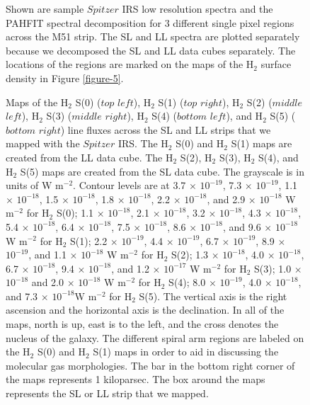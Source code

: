 \documentclass[12pt,preprint]{aastex}
\begin{document}
\clearpage

\begin{figure}
\caption{Shown are sample $Spitzer$ IRS low resolution 
spectra and the PAHFIT spectral decomposition for 3 different 
single pixel regions across the M51 strip.  The SL and LL spectra 
are plotted separately because we decomposed the SL and LL 
data cubes separately.  The locations of the regions are 
marked on the maps of the H$_2$ surface density in Figure 
\ref{figure-5}.}
\label{figure-2}
\end{figure}

\clearpage

\begin{figure}
 \end{figure}
 \clearpage
 
 \begin{figure}
 \caption{Maps of the H$_2$ S(0) ($top$ $left$), H$_2$ S(1)
 ($top$ $right$), H$_2$ S(2) ($middle$ $left$), H$_2$ S(3) 
 ($middle$ $right$), H$_2$ S(4) ($bottom$ $left$), and H$_2$ 
 S(5) ($bottom$ $right$) line fluxes across the SL and LL strips that we mapped 
 with the $Spitzer$ IRS.  The H$_2$ S(0) and H$_2$ S(1) 
 maps are created from the LL data cube.    
The H$_2$ S(2), H$_2$ S(3), H$_2$ S(4), and 
H$_2$ S(5) maps are created from the SL data cube.  
The grayscale is in units of W $\mathrm{m^{-2}}$.  Contour levels are at 
3.7 $\times$ ${10^{-19}}$, 7.3 $\times$ ${10^{-19}}$, 1.1 $\times$ ${10^{-18}}$, 1.5 $\times$ ${10^{-18}}$, 1.8 $\times$ ${10^{-18}}$, 2.2 $\times$ ${10^{-18}}$, and 2.9 $\times$ ${10^{-18}}$ W $\mathrm{m^{-2}}$ for H$_2$ S(0); 
1.1 $\times$ ${10^{-18}}$, 2.1 $\times$ ${10^{-18}}$, 3.2 $\times$ ${10^{-18}}$, 4.3 $\times$ ${10^{-18}}$, 5.4 $\times$ ${10^{-18}}$, 6.4 $\times$ ${10^{-18}}$, 7.5 $\times$ ${10^{-18}}$, 8.6 $\times$ ${10^{-18}}$, and 9.6 $\times$ ${10^{-18}}$ W $\mathrm{m^{-2}}$ for H$_2$ S(1); 
2.2 $\times$ ${10^{-19}}$, 4.4 $\times$ ${10^{-19}}$,  6.7 $\times$ ${10^{-19}}$, 8.9 $\times$ ${10^{-19}}$, and 1.1 $\times$ ${10^{-18}}$ W $\mathrm{m^{-2}}$ for H$_2$ S(2);
1.3 $\times$ ${10^{-18}}$, 4.0 $\times$ ${10^{-18}}$, 6.7 $\times$ ${10^{-18}}$, 9.4 $\times$ ${10^{-18}}$, and 1.2 $\times$ ${10^{-17}}$ W $\mathrm{m^{-2}}$ for H$_2$ S(3);  
1.0 $\times$ ${10^{-18}}$ and 2.0 $\times$ ${10^{-18}}$ W $\mathrm{m^{-2}}$ for H$_2$ S(4); 
8.0 $\times$ ${10^{-19}}$, 4.0 $\times$ ${10^{-18}}$, and 7.3 $\times$ ${10^{-18}}$W $\mathrm{m^{-2}}$ for H$_2$ S(5).  
The vertical axis is the right ascension and the horizontal axis is the declination.  
In all of the maps, north is up, east is to the left, and the cross 
denotes the nucleus of the galaxy.  The different spiral 
arm regions are labeled on the H$_2$ S(0) and H$_2$ S(1) 
maps in order to aid in discussing the molecular gas morphologies.  
The bar in the bottom right corner of the maps 
represents 1 kiloparsec.  The box around 
the maps represents the SL or LL strip that we mapped.}
  \label{figure-3}
  \end{figure}
\end{document}
